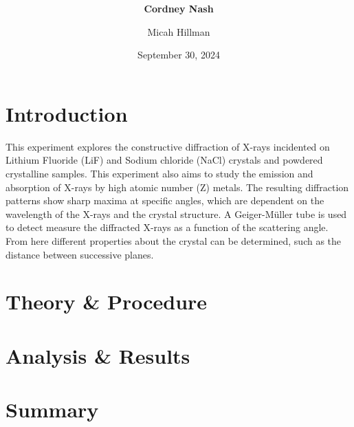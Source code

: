 \documentclass[a4paper,12pt,english]{all-in-one} %
\title{{\large\textit{}}\\[0.5cm]{\Huge\color{gray}\textsc{\@docsubtitle}}}
\author{\textbf{Cordney Nash}  \and Micah Hillman  }
\date{September 30, 2024}
\begin{document}
\begin{titlepage}
\maketitle\vfill
\end{titlepage}
\newpage


\section*{Introduction}
{
This experiment explores the constructive diffraction of X-rays incidented on Lithium Fluoride (LiF) and Sodium chloride (NaCl) crystals and powdered crystalline samples. This experiment also aims to study the emission and absorption of X-rays by high atomic number (Z) metals. The resulting diffraction patterns show sharp maxima at specific angles, which are dependent on the wavelength of the X-rays and the crystal structure. A Geiger-Müller tube is used to detect measure the diffracted X-rays as a function of the scattering angle. From here different properties about the crystal can be determined, such as the distance between successive planes.
}

\begin{multicols}{2}

\section*{Theory \& Procedure}


\lipsum[4-8] 
    
\section*{Analysis \& Results}
    \lipsum[10-13]

\end{multicols}

\section*{Summary}
        \lipsum[14]
        \lipsum[15]
\end{document}

